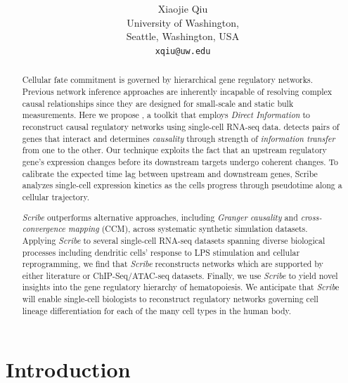 \documentclass[10pt,oneside]{article}\usepackage[]{graphicx}\usepackage[]{color}
\title{\textsf{\textbf{\thetitle}}}
\author{Xiaojie Qiu\\[1em]University of Washington,\\ Seattle, Washington, USA\\
\texttt{xqiu@uw.edu} 
}
\begin{document}








\maketitle
\begin{abstract}
Cellular fate commitment is governed by hierarchical gene regulatory networks. Previous network inference approaches are inherently incapable of resolving complex causal relationships since they are designed for small-scale and static bulk measurements. Here we propose , a toolkit that employs \emph{Direct Information} to reconstruct causal regulatory networks using single-cell RNA-seq data.  detects pairs of genes that interact and determines \emph{causality} through strength of \emph{information transfer} from one to the other. Our technique exploits the fact that an upstream regulatory gene's expression changes before its downstream targets undergo coherent changes. To calibrate the expected time lag between upstream and downstream genes, Scribe analyzes single-cell expression kinetics as the cells progress through pseudotime along a cellular trajectory.

\emph{Scribe} outperforms alternative approaches, including \emph{Granger causality} and \emph{cross-convergence mapping} (CCM), across systematic synthetic simulation datasets. Applying \emph{Scribe} to several single-cell RNA-seq datasets spanning diverse biological processes including dendritic cells' response to LPS stimulation and cellular reprogramming, we find that \emph{Scribe} reconstructs networks which are supported by either literature or ChIP-Seq/ATAC-seq datasets. Finally, we use \emph{Scribe} to yield novel insights into the gene regulatory hierarchy of hematopoiesis. We anticipate that \emph{Scrib}e will enable single-cell biologists to reconstruct regulatory networks governing cell lineage differentiation for each of the many cell types in the human body. 
% 
\end{abstract}

\tableofcontents



\section{Introduction}
\end{document}
